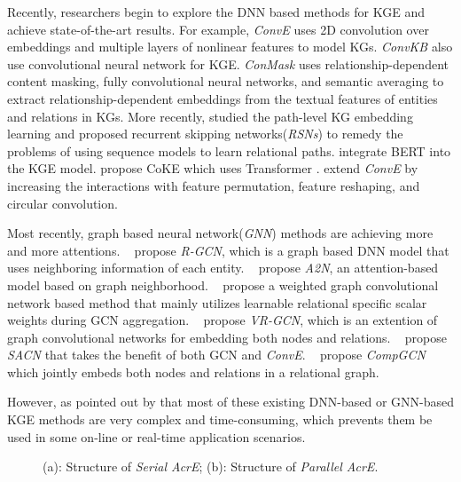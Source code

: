\documentclass[11pt]{article}
\begin{document}
 

Recently, researchers begin to explore the DNN based methods for KGE and achieve state-of-the-art results. For example, \emph{ConvE} \cite{Dettmers:2018} uses 2D convolution over embeddings and multiple layers of nonlinear features to model KGs. \emph{ConvKB} \cite{Nguyen:2018} also use convolutional neural network for KGE. \emph{ConMask} \cite{Shi:2018}uses relationship-dependent content masking, fully convolutional neural networks, and semantic averaging to extract relationship-dependent embeddings from the textual features of entities and relations in KGs.  More recently, 
 studied the path-level KG embedding learning and proposed recurrent skipping networks(\emph{RSNs}) to remedy the problems of using sequence models to learn relational paths.   integrate BERT \cite{Devlin:2019} into the KGE model.  propose CoKE which uses Transformer \cite{Vaswani:2017}.  extend {\em ConvE} by increasing the interactions with feature permutation, feature reshaping, and circular convolution.


Most recently, graph based neural network(\emph{GNN}) methods are achieving more and more attentions. ~ propose {\em R-GCN}, which is a graph based DNN model that uses neighboring information of each entity.   ~ propose \emph{A2N}, an attention-based model  based on graph neighborhood. ~ propose a weighted graph convolutional network based method that mainly utilizes learnable relational specific scalar weights during GCN aggregation. ~ propose \emph{VR-GCN}, which is an extention of graph convolutional networks for embedding both nodes and relations. ~ propose \emph{SACN} that takes the benefit of both GCN and \emph{ConvE}. ~  propose \emph{CompGCN} which jointly embeds both nodes and relations in a relational graph. 


However, as pointed out by  that most of these existing DNN-based or GNN-based KGE methods are very complex and time-consuming, which prevents them be used in some on-line or real-time application scenarios.

\begin{figure}[t]
	\centering{}
	\centering{}


\begin{comment}	
	\qquad
	\subfigure[]{\texttt{[image: 1.pdf]}}
	\qquad
	\raisebox{0cm}
	{\hsize=0em
		\vbox{\subfigure[]{\texttt{[image: 2.pdf]}} 
			\qquad \qquad
			
			\qquad
			\subfigure[]{\texttt{[image: 3.pdf]}}
		}
	}
\end{comment}
	\caption{(a): Structure of  {\em Serial AcrE}; (b): Structure of  {\em Parallel AcrE}.}\label{fig:frame}


\end{figure}
\end{document}
